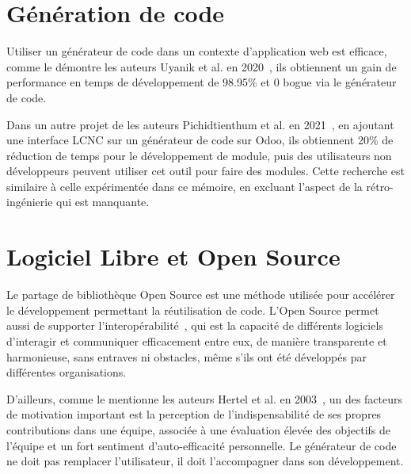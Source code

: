 \section{Génération de code}

Utiliser un générateur de code dans un contexte d'application web est efficace, comme le démontre les auteurs Uyanik et al. en 2020~\cite{SAHIN2020}, ils obtiennent un gain de performance en temps de développement de 98.95\% et 0 bogue via le générateur de code.

Dans un autre projet de les auteurs Pichidtienthum et al. en 2021~\cite{9436754}, en ajoutant une interface LCNC sur un générateur de code sur Odoo, ils obtiennent 20\% de réduction de temps pour le développement de module, puis des utilisateurs non développeurs peuvent utiliser cet outil pour faire des modules. Cette recherche est similaire à celle expérimentée dans ce mémoire, en excluant l'aspect de la rétro-ingénierie qui est manquante.

\section{Logiciel Libre et Open Source}

Le partage de bibliothèque Open Source est une méthode utilisée pour accélérer le développement permettant la réutilisation de code. L’Open Source permet aussi de supporter l'interopérabilité~\cite{open_interop_2011}, qui est la capacité de différents logiciels d'interagir et communiquer efficacement entre eux, de manière transparente et harmonieuse, sans entraves ni obstacles, même s’ils ont été développés par différentes organisations.

D'ailleurs, comme le mentionne les auteurs Hertel et al. en 2003~\cite{HERTEL20031159}, un des facteurs de motivation important est la perception de l'indispensabilité de ses propres contributions dans une équipe, associée à une évaluation élevée des objectifs de l'équipe et un fort sentiment d'auto-efficacité personnelle. Le générateur de code ne doit pas remplacer l'utilisateur, il doit l'accompagner dans son développement.


